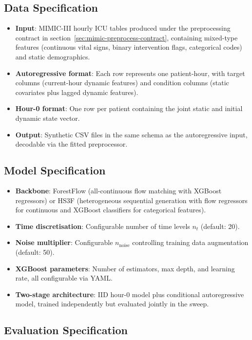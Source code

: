 \subsection{Data Specification}

\begin{itemize}\tightlist
    \item \textbf{Input}: MIMIC-III hourly ICU tables produced under the preprocessing contract in section~\ref{sec:mimic-preprocess-contract}, containing mixed-type features (continuous vital signs, binary intervention flags, categorical codes) and static demographics.
    \item \textbf{Autoregressive format}: Each row represents one patient-hour, with target columns (current-hour dynamic features) and condition columns (static covariates plus lagged dynamic features).
    \item \textbf{Hour-0 format}: One row per patient containing the joint static and initial dynamic state vector.
    \item \textbf{Output}: Synthetic CSV files in the same schema as the autoregressive input, decodable via the fitted preprocessor.
\end{itemize}

\subsection{Model Specification}

\begin{itemize}\tightlist
    \item \textbf{Backbone}: ForestFlow (all-continuous flow matching with XGBoost regressors) or HS3F (heterogeneous sequential generation with flow regressors for continuous and XGBoost classifiers for categorical features).
    \item \textbf{Time discretisation}: Configurable number of time levels $n_t$ (default: 20).
    \item \textbf{Noise multiplier}: Configurable $n_{\text{noise}}$ controlling training data augmentation (default: 50).
    \item \textbf{XGBoost parameters}: Number of estimators, max depth, and learning rate, all configurable via YAML.
    \item \textbf{Two-stage architecture}: IID hour-0 model plus conditional autoregressive model, trained independently but evaluated jointly in the sweep.
\end{itemize}

\subsection{Evaluation Specification}

